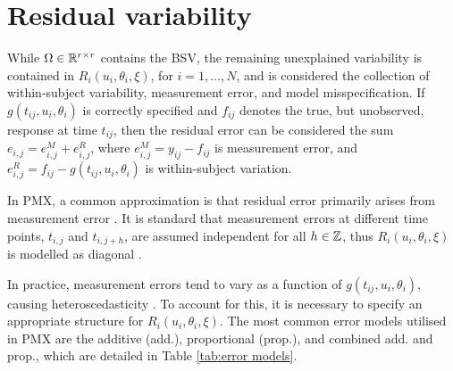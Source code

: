 
\section{Residual variability}

While $\Omega \in \mathbb{R}^{r \times r}$ contains the BSV, the remaining unexplained variability is contained in $R_i(u_i,\theta_i,\xi)$, for $i=1,\dots,N$, and is considered the collection of within-subject variability, measurement error, and model misspecification. If $g(t_{ij},u_i,\theta_i)$ is correctly specified and $f_{ij}$ denotes the true, but unobserved, response at time $t_{ij}$, then the residual error can be considered the sum $e_{i,j}=e^M_{i,j}+e^R_{i,j}$, where $e^M_{i,j}=y_{ij}-f_{ij}$ is measurement error, and $e^R_{i,j}=f_{ij}-g(t_{ij},u_i,\theta_i)$ is within-subject variation.

In PMX, a common approximation is that residual error primarily arises from measurement error \citep{Karlsson1995}. It is standard that measurement errors at different time points, $t_{i,j}$ and $t_{i,j+h}$, are assumed independent for all $h \in \mathbb{Z}$, thus $R_i(u_i,\theta_i,\xi)$ is modelled as diagonal \citep[p. 398]{Davidian2003}.

In practice, measurement errors tend to vary as a function of $g(t_{ij},u_i,\theta_i)$, causing heteroscedasticity \citep[p. 398]{Davidian2003}. To account for this, it is necessary to specify an appropriate structure for $R_i(u_i,\theta_i,\xi)$. The most common error models utilised in PMX are the additive (add.), proportional (prop.), and combined add. and prop., which are detailed in Table \ref{tab:error models}. 

